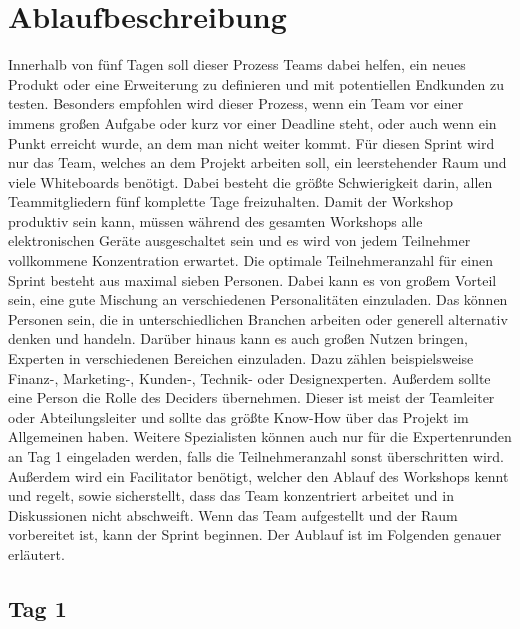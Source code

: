 \section{Ablaufbeschreibung}
Innerhalb von fünf Tagen soll dieser Prozess Teams dabei helfen, ein neues Produkt oder eine Erweiterung zu definieren und mit potentiellen Endkunden zu testen. Besonders empfohlen wird dieser Prozess, wenn ein Team vor einer immens großen Aufgabe oder kurz vor einer Deadline steht, oder auch wenn ein Punkt erreicht wurde, an dem man nicht weiter kommt. Für diesen Sprint wird nur das Team, welches an dem Projekt arbeiten soll, ein leerstehender Raum und viele Whiteboards benötigt. Dabei besteht die größte Schwierigkeit darin, allen Teammitgliedern fünf komplette Tage freizuhalten. Damit der Workshop produktiv sein kann, müssen während des gesamten Workshops alle elektronischen Geräte ausgeschaltet sein und es wird von jedem Teilnehmer vollkommene Konzentration erwartet. Die optimale Teilnehmeranzahl für einen Sprint besteht aus maximal sieben Personen. Dabei kann es von großem Vorteil sein, eine gute Mischung an verschiedenen Personalitäten einzuladen. Das können Personen sein, die in unterschiedlichen Branchen arbeiten oder generell alternativ denken und handeln. Darüber hinaus kann es auch großen Nutzen bringen, Experten in verschiedenen Bereichen einzuladen. Dazu zählen beispielsweise Finanz-, Marketing-, Kunden-, Technik- oder Designexperten. Außerdem sollte eine Person die Rolle des Deciders übernehmen. Dieser ist meist der Teamleiter oder Abteilungsleiter und sollte das größte Know-How über das Projekt im Allgemeinen haben. Weitere Spezialisten können auch nur für die Expertenrunden an Tag 1 eingeladen werden, falls die Teilnehmeranzahl sonst überschritten wird. Außerdem wird ein Facilitator benötigt, welcher den Ablauf des Workshops kennt und regelt, sowie sicherstellt, dass das Team konzentriert arbeitet und in Diskussionen nicht abschweift. Wenn das Team aufgestellt und der Raum vorbereitet ist, kann der Sprint beginnen. Der Aublauf ist im Folgenden genauer erläutert.

\subsection*{Tag 1}
